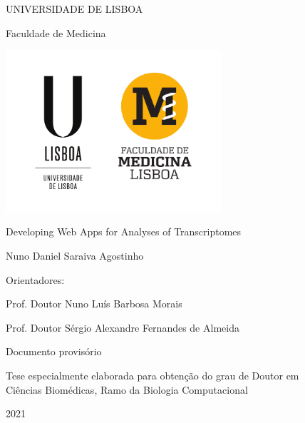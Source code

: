 \documentclass[12pt, twoside]{report}
\begin{document}
\begin{titlepage}
    \begin{center}
        \vspace*{-.2cm}
        UNIVERSIDADE DE LISBOA
        
        Faculdade de Medicina
        
        \includegraphics[width=0.6\textwidth]{images/logo/ulisboa}
        
        \vspace{1.8cm}
        Developing Web Apps for Analyses of Transcriptomes

        \vspace{1.1cm}        
            
        \vspace{0.9cm}            
        Nuno Daniel Saraiva Agostinho
    \end{center}

    \vspace{0.9cm}
    Orientadores:

      Prof. Doutor Nuno Luís Barbosa Morais

      Prof. Doutor Sérgio Alexandre Fernandes de Almeida
    
    \vspace{2.2cm}
    \begin{center}
        Documento provisório
        
        Tese especialmente elaborada para obtenção do grau de Doutor em\\
        Ciências Biomédicas, Ramo da Biologia Computacional
            
        \vfill
        2021
        \vspace{.7cm}    
    \end{center}
\end{titlepage}
\end{document}
